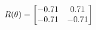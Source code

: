 \documentclass[preview]{standalone}
\begin{document}
\begin{align*}
\special{dvisvgm:raw <g id='unique000'>}R(\theta) = \begin{bmatrix}-0.71 & 0.71\\-0.71 & -0.71\end{bmatrix}\special{dvisvgm:raw </g>}
\end{align*}
\end{document}
